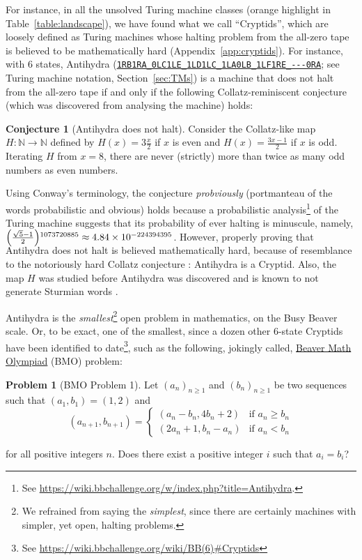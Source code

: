 \documentclass[a4paper,british]{article}
\theoremstyle{definition} %
\newtheorem{conjecture}{Conjecture}[section]
\newtheorem{problem}{Problem}[section]
\numberwithin{equation}{section}
\theoremstyle{definition} %
\newcommand{\tm}[1]{\href{https://bbchallenge.org/#1}{\texttt{\nolinkurl{#1}}}}
\begin{document}
For instance, in all the unsolved Turing machine classes (orange highlight in Table~\ref{table:landscape}), we have found what we call ``Cryptids'', which are loosely defined as Turing machines whose halting problem from the all-zero tape is believed to be mathematically hard (Appendix~\ref{app:cryptids}). For instance, with 6 states, Antihydra (\tm{1RB1RA_0LC1LE_1LD1LC_1LA0LB_1LF1RE_---0RA}; see Turing machine notation, Section~\ref{sec:TMs}) is a machine that does not halt from the all-zero tape if and only if the following Collatz-reminiscent conjecture (which was discovered from analysing the machine) holds:


\begin{conjecture}[Antihydra does not halt]
    Consider the Collatz-like map $H: \mathbb{N} \to \mathbb{N}$ defined by $H(x) = 3\frac{x}{2}$ if $x$ is even and $H(x) = \frac{3x-1}{2}$ if $x$ is odd. Iterating $H$ from $x=8$, there are never (strictly) more than twice as many odd numbers as even numbers.
\end{conjecture}

Using Conway's terminology, the conjecture \textit{probviously} (portmanteau of the words probabilistic and obvious) holds because a probabilistic analysis\footnote{See \url{https://wiki.bbchallenge.org/w/index.php?title=Antihydra}.} of the Turing machine suggests that its probability of ever halting is minuscule, namely, $\smash{\left(\frac{\sqrt{5}-1}{2}\right)}^{1073720885}\approx 4.84\times 10^{-224394395}$. However, properly proving that Antihydra does not halt is believed mathematically hard, because of resemblance to the notoriously hard Collatz conjecture \cite{LagariasCollatz}: Antihydra is a Cryptid. Also, the map $H$ was studied before Antihydra was discovered and is known to not generate Sturmian words \cite{DUBICKAS_2009}.

Antihydra is the \textit{smallest}\footnote{We refrained from saying the \textit{simplest}, since there are certainly machines with simpler, yet open, halting problems.} open problem in mathematics, on the Busy Beaver scale. Or, to be exact, one of the smallest, since a dozen other 6-state Cryptids have been identified to date\footnote{See \url{https://wiki.bbchallenge.org/wiki/BB(6)\#Cryptids}}, such as the following, jokingly called, \href{https://wiki.bbchallenge.org/wiki/Beaver_Math_Olympiad}{Beaver Math Olympiad} (BMO) problem:

\begin{problem}[BMO Problem 1]
Let $(a_n)_{n \ge 1}$ and $(b_n)_{n \ge 1}$ be two sequences such that $(a_1, b_1) = (1, 2)$ and
$$(a_{n+1}, b_{n+1}) = \begin{cases}
        (a_n-b_n, 4b_n+2) & \text{if }a_n \ge b_n \\
        (2a_n+1, b_n-a_n) & \text{if }a_n < b_n
    \end{cases}$$

\noindent for all positive integers $n$. Does there exist a positive integer $i$ such that $a_i = b_i$?
\end{problem}
\end{document}
